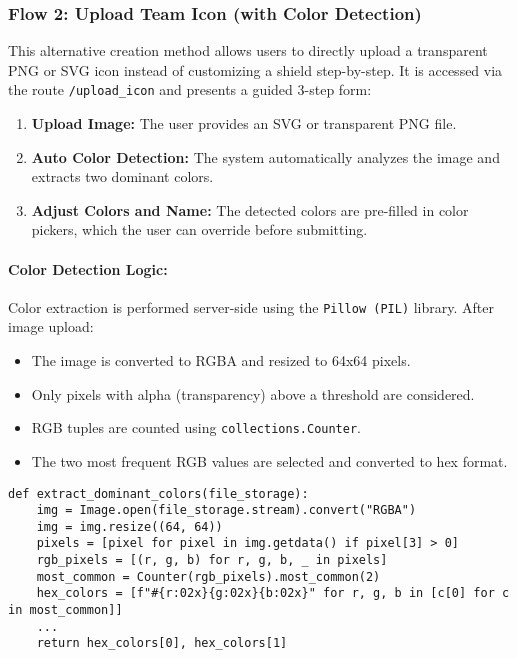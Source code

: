 \documentclass[12pt]{article}
\begin{document}
\subsubsection*{Flow 2: Upload Team Icon (with Color Detection)}

This alternative creation method allows users to directly upload a transparent PNG or SVG icon instead of customizing a shield step-by-step. It is accessed via the route \texttt{/upload\_icon} and presents a guided 3-step form:

\begin{enumerate}
    \item \textbf{Upload Image:} The user provides an SVG or transparent PNG file.
    \item \textbf{Auto Color Detection:} The system automatically analyzes the image and extracts two dominant colors.
    \item \textbf{Adjust Colors and Name:} The detected colors are pre-filled in color pickers, which the user can override before submitting.
\end{enumerate}

\paragraph{Color Detection Logic:}
Color extraction is performed server-side using the \texttt{Pillow (PIL)} library. After image upload:

\begin{itemize}
    \item The image is converted to RGBA and resized to 64x64 pixels.
    \item Only pixels with alpha (transparency) above a threshold are considered.
    \item RGB tuples are counted using \texttt{collections.Counter}.
    \item The two most frequent RGB values are selected and converted to hex format.
\end{itemize}

\begin{verbatim}
def extract_dominant_colors(file_storage):
    img = Image.open(file_storage.stream).convert("RGBA")
    img = img.resize((64, 64))
    pixels = [pixel for pixel in img.getdata() if pixel[3] > 0]
    rgb_pixels = [(r, g, b) for r, g, b, _ in pixels]
    most_common = Counter(rgb_pixels).most_common(2)
    hex_colors = [f"#{r:02x}{g:02x}{b:02x}" for r, g, b in [c[0] for c in most_common]]
    ...
    return hex_colors[0], hex_colors[1]
\end{verbatim}
\end{document}
